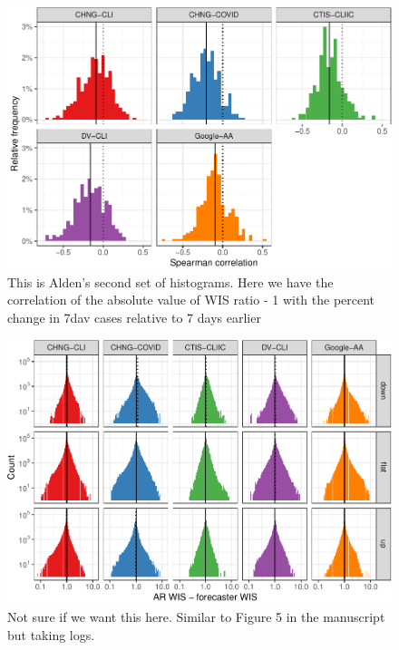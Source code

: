 \documentclass[9pt,twoside,lineno]{pnas-new}
\begin{document}
\clearpage

\begin{figure}

{\centering \includegraphics[width=\textwidth]{fig/cor-wis-ratio-m1-1} 

}

\caption{This is Alden's second set of histograms. Here we have the correlation of the absolute value of WIS ratio - 1 with the percent change in 7dav cases relative to 7 days earlier}\label{fig:cor-wis-ratio-m1}
\end{figure}

\clearpage

\begin{figure}

{\centering \includegraphics[width=\textwidth]{fig/upswing-histogram-logged-1} 

}

\caption{Not sure if we want this here. Similar to Figure 5 in the manuscript but taking logs. }\label{fig:upswing-histogram-logged}
\end{figure}
\end{document}
